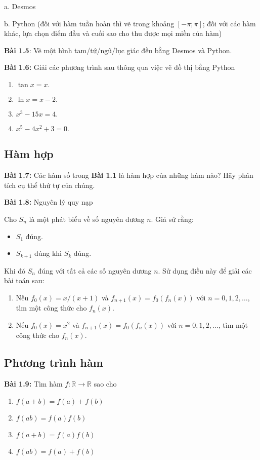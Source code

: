 a. Desmos 
\vspace{5pt}

b. Python (đối với hàm tuần hoàn thì vẽ trong khoảng $[-\pi;\pi]$; đối với các hàm khác, lựa chọn điểm đầu và cuối sao cho thu được mọi miền của hàm)
\vspace{5pt}

\textbf{Bài 1.5}: Vẽ một hình tam/tứ/ngũ/lục giác đều bằng Desmos và Python.
\vspace{5pt}

\textbf{Bài 1.6:} Giải các phương trình sau thông qua việc vẽ đồ thị bằng Python
\begin{enumerate}[label=(\alph*)]
    \item $\tan x= x.$
    \item $\ln x = x-2.$
    \item $x^3 -15x =4.$
    \item $x^5 -4x^2 +3=0.$
\end{enumerate}
\subsection*{Hàm hợp}

\textbf{Bài 1.7:} Các hàm số trong \textbf{Bài 1.1} là hàm hợp của những hàm nào? Hãy phân tích cụ thể thứ tự của chúng.
\vspace{5pt}

\textbf{Bài 1.8:} Nguyên lý quy nạp\newline

Cho $S_n$ là một phát biểu về số nguyên dương $n$. Giả sử rằng:
\begin{itemize}
    \item $S_1$ đúng.
    \item $S_{k+1}$ đúng khi $S_k$ đúng.
\end{itemize}
Khi đó $S_n$ đúng với tất cả các số nguyên dương $n$.\newline
Sử dụng điều này để giải các bài toán sau:
\begin{enumerate}[label=(\alph*)]
    \item Nếu $f_0(x) =x/(x+1)$ và $f_{n+1}(x)=f_0(f_n(x))$ với $n=0, 1, 2,\dots$, tìm một công thức cho $f_n(x)$.
\item Nếu $f_0(x) =x^2$ và $f_{n+1}(x)=f_0(f_n(x))$ với $n=0, 1, 2,\dots$, tìm một công thức cho $f_n(x)$.
\end{enumerate}
\vspace{5pt}
\subsection*{Phương trình hàm}
\textbf{Bài 1.9:} Tìm hàm \(f: \mathbb{R}\rightarrow\mathbb{R}\) sao cho
\begin{enumerate}[label=(\alph*)]
    \item \(f(a+b)=f(a)+f(b)\)
    \item \(f(ab)=f(a)f(b)\)
    \item \(f(a+b)=f(a)f(b)\)
    \item \(f(ab)=f(a)+f(b)\)
\end{enumerate}

